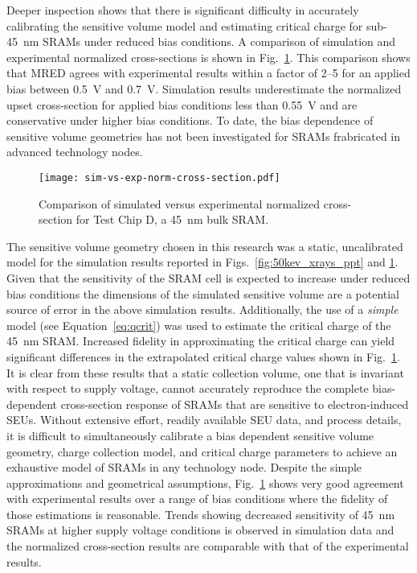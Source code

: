 Deeper inspection shows that there is significant difficulty in accurately calibrating the sensitive volume model and estimating critical charge for sub-45~nm SRAMs under reduced bias conditions.
A comparison of simulation and experimental normalized cross-sections is shown in Fig.~\ref{fig:sim-vs-exp-norm-cross-section}.
This comparison shows that MRED agrees with experimental results within a factor of 2--5 for an applied bias between 0.5~V and 0.7~V.
Simulation results underestimate the normalized upset cross-section for applied bias conditions less than 0.55~V and are conservative under higher bias conditions.
To date, the bias dependence of sensitive volume geometries has not been investigated for SRAMs frabricated in advanced technology nodes.

\begin{figure}[tb]
    \begin{center}
        \texttt{[image: sim-vs-exp-norm-cross-section.pdf]}
    \end{center}
    \caption{Comparison of simulated versus experimental normalized cross-section for Test Chip D, a 45~nm bulk SRAM.}
    \label{fig:sim-vs-exp-norm-cross-section}
\end{figure}

The sensitive volume geometry chosen in this research was a static, uncalibrated model for the simulation results reported in Figs.~\ref{fig:50kev_xrays_ppt} and \ref{fig:sim-vs-exp-norm-cross-section}.
Given that the sensitivity of the SRAM cell is expected to increase under reduced bias conditions the dimensions of the simulated sensitive volume are a potential source of error in the above simulation results.
Additionally, the use of a \emph{simple} model (see Equation~\ref{eq:qcrit}) was used to estimate the critical charge of the 45~nm SRAM.
Increased fidelity in approximating the critical charge can yield significant differences in the extrapolated critical charge values shown in Fig.~\ref{fig:sim-vs-exp-norm-cross-section}.
It is clear from these results that a static collection volume, one that is invariant with respect to supply voltage, cannot accurately reproduce the complete bias-dependent cross-section response of SRAMs that are sensitive to electron-induced SEUs.
Without extensive effort, readily available SEU data, and process details, it is difficult to simultaneously calibrate a bias dependent sensitive volume geometry, charge collection model, and critical charge parameters to achieve an exhaustive model of SRAMs in any technology node.
Despite the simple approximations and geometrical assumptions, Fig.~\ref{fig:sim-vs-exp-norm-cross-section} shows very good agreement with experimental results over a range of bias conditions where the fidelity of those estimations is reasonable.
Trends showing decreased sensitivity of 45~nm SRAMs at higher supply voltage conditions is observed in simulation data and the normalized cross-section results are comparable with that of the experimental results.


